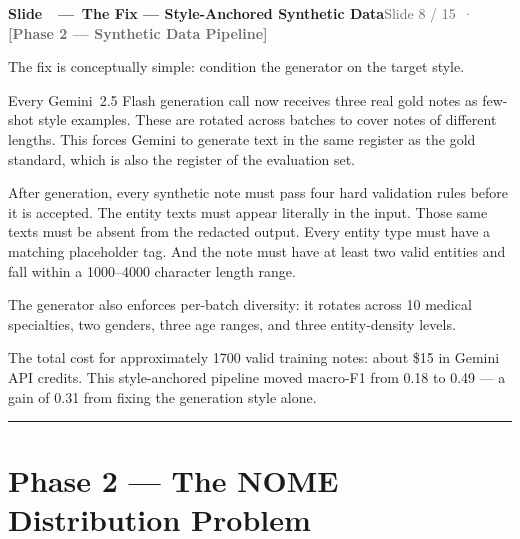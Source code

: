 \documentclass[11pt,a4paper]{article}
\newcommand{\phaselabel}[2]{\textbf{\textcolor{#1}{[#2]}}}
\newcounter{slidectr}
\newcommand{\slidescript}[3]{%
  \stepcounter{slidectr}
  \begin{slidebox}
    \noindent\textbf{Slide \theslidectr\ \,—\, #1}\hfill\small\textcolor{dimgray}{#2}
  \end{slidebox}
  \vspace{0.4em}
  #3
  \vspace{1.2em}
  \noindent\textcolor{dimgray!60}{\rule{\linewidth}{0.4pt}}
  \vspace{0.6em}
}
\begin{document}
\slidescript{The Fix — Style-Anchored Synthetic Data}{Slide 8 / 15 \,·\, \phaselabel{phase2}{Phase 2 — Synthetic Data Pipeline}}{

The fix is conceptually simple: condition the generator on the target style.

Every Gemini~2.5 Flash generation call now receives three real gold notes as few-shot style examples. These are rotated across batches to cover notes of different lengths. This forces Gemini to generate text in the same register as the gold standard, which is also the register of the evaluation set.

After generation, every synthetic note must pass four hard validation rules before it is accepted. The entity texts must appear literally in the input. Those same texts must be absent from the redacted output. Every entity type must have a matching placeholder tag. And the note must have at least two valid entities and fall within a 1000--4000 character length range.

The generator also enforces per-batch diversity: it rotates across 10 medical specialties, two genders, three age ranges, and three entity-density levels.

The total cost for approximately 1700 valid training notes: about \$15 in Gemini API credits. This style-anchored pipeline moved macro-F1 from 0.18 to 0.49 — a gain of 0.31 from fixing the generation style alone.

}

\section{Phase 2 --- The NOME Distribution Problem}
\end{document}
